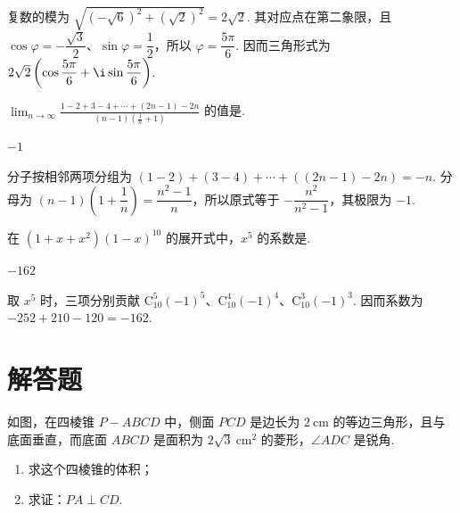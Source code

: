 \begin{solution}
复数的模为 \(\sqrt{(-\sqrt6)^2+(\sqrt2)^2}=2\sqrt2\). 其对应点在第二象限，且 \(\cos\varphi=-\dfrac{\sqrt3}{2}\)、\(\sin\varphi=\dfrac12\)，所以 \(\varphi=\dfrac{5\pi}{6}\). 因而三角形式为 \(2\sqrt2\left(\cos\dfrac{5\pi}{6}+\i\sin\dfrac{5\pi}{6}\right)\).
\end{solution}

\begin{problem}
\(\displaystyle\lim_{n \to \infty}\frac{1 - 2 + 3 - 4 + \cdots + (2n - 1) - 2n}{(n - 1)\left(\frac{1}{n} + 1\right)}\) 的值是\fillinblank{}.
\end{problem}

\begin{answer}
\(-1\)
\end{answer}

\begin{solution}
分子按相邻两项分组为 \((1-2)+(3-4)+\cdots+((2n-1)-2n)=-n\). 分母为 \((n-1)\left(1+\dfrac1n\right)=\dfrac{n^2-1}{n}\)，所以原式等于 \(-\dfrac{n^2}{n^2-1}\)，其极限为 \(-1\).
\end{solution}

\begin{problem}
在 \((1 + x + x^2)(1 - x)^{10}\) 的展开式中，\(x^5\) 的系数是\fillinblank{}.
\end{problem}

\begin{answer}
\(-162\)
\end{answer}

\begin{solution}
取 \(x^5\) 时，三项分别贡献 \(\mathrm C_{10}^{5}(-1)^5\)、\(\mathrm C_{10}^{4}(-1)^4\)、\(\mathrm C_{10}^{3}(-1)^3\). 因而系数为 \(-252+210-120=-162\).
\end{solution}

\section{解答题}

\begin{problem}
如图，在四棱锥 \(P-ABCD\) 中，侧面 \(PCD\) 是边长为 \(2\mathrm{~cm}\) 的等边三角形，且与底面垂直，而底面 \(ABCD\) 是面积为 \(2\sqrt{3}\mathrm{~cm}^2\) 的菱形，\(\angle ADC\) 是锐角.
\begin{enumerate}
\item 求这个四棱锥的体积；
\item 求证：\(PA \perp CD\).
\end{enumerate}

\end{problem}


